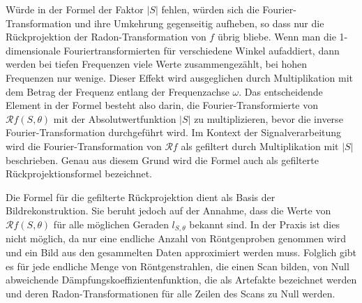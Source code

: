 Würde in der Formel der Faktor $|S|$ fehlen, würden sich die Fourier-Transformation und ihre Umkehrung gegenseitig aufheben, so dass nur die Rückprojektion der Radon-Transformation von $f$ übrig bliebe. Wenn man die 1-dimensionale Fouriertransformierten für verschiedene Winkel aufaddiert, dann werden bei tiefen Frequenzen viele Werte zusammengezählt, bei hohen Frequenzen nur wenige. Dieser Effekt wird ausgeglichen durch Multiplikation mit dem Betrag der Frequenz entlang der Frequenzachse $\omega$. Das entscheidende Element in der Formel besteht also darin, die Fourier-Transformierte von $\mathscr{R}f(S, \theta)$ mit der Absolutwertfunktion $|S|$ zu multiplizieren, bevor die inverse Fourier-Transformation durchgeführt wird. Im Kontext der Signalverarbeitung wird die Fourier-Transformation von $\mathscr{R}f$ als gefiltert durch Multiplikation mit $|S|$ beschrieben. Genau aus diesem Grund wird die Formel auch als \glqq gefilterte Rückprojektionsformel\grqq{} bezeichnet.

Die Formel für die gefilterte Rückprojektion dient als Basis der Bildrekonstruktion. Sie beruht jedoch auf der Annahme, dass die Werte von $\mathscr{R}f(S, \theta)$ für alle möglichen Geraden $l_{S, \theta}$ bekannt sind. In der Praxis ist dies nicht möglich, da nur eine endliche Anzahl von Röntgenproben genommen wird und ein Bild aus den gesammelten Daten approximiert werden muss. Folglich gibt es für jede endliche Menge von Röntgenstrahlen, die einen Scan bilden, von Null abweichende Dämpfungskoeffizientenfunktion, die als Artefakte bezeichnet werden und deren Radon-Transformationen für alle Zeilen des Scans zu Null werden.




















